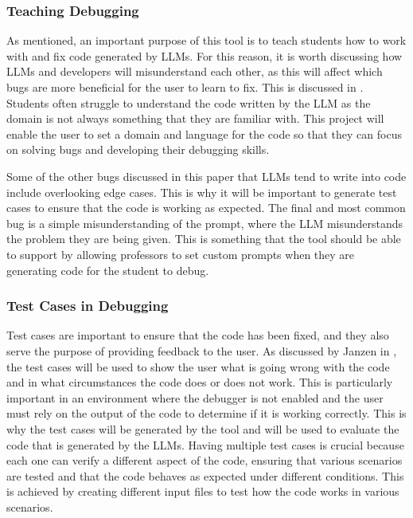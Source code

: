 \documentclass[12pt]{extarticle}
\begin{document}
\subsubsection{Teaching Debugging}

As mentioned, an important purpose of this tool is to teach students how to work with and fix code generated by LLMs. For this reason, it is worth discussing how LLMs and developers will misunderstand each other, as this will affect which bugs are more beneficial for the user to learn to fix. This is discussed in \cite{nguyen2024}. Students often struggle to understand the code written by the LLM as the domain is not always something that they are familiar with. This project will enable the user to set a domain and language for the code so that they can focus on solving bugs and developing their debugging skills. 

Some of the other bugs discussed in this paper that LLMs tend to write into code include overlooking edge cases. This is why it will be important to generate test cases to ensure that the code is working as expected. The final and most common bug is a simple misunderstanding of the prompt, where the LLM misunderstands the problem they are being given. This is something that the tool should be able to support by allowing professors to set custom prompts when they are generating code for the student to debug.

\subsubsection{Test Cases in Debugging}

Test cases are important to ensure that the code has been fixed, and they also serve the purpose of providing feedback to the user. As discussed by Janzen in \cite{Janzen2008}, the test cases will be used to show the user what is going wrong with the code and in what circumstances the code does or does not work. This is particularly important in an environment where the debugger is not enabled and the user must rely on the output of the code to determine if it is working correctly. This is why the test cases will be generated by the tool and will be used to evaluate the code that is generated by the LLMs. Having multiple test cases is crucial because each one can verify a different aspect of the code, ensuring that various scenarios are tested and that the code behaves as expected under different conditions. This is achieved by creating different input files to test how the code works in various scenarios.
\end{document}
